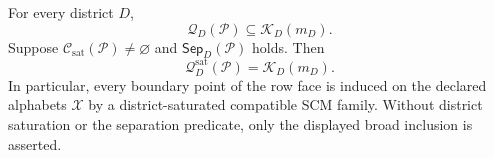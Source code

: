 For every district \(D\),
\[
\mathcal Q_D(\mathcal P)\subseteq\mathcal K_D(m_D).
\]
Suppose \(\mathcal C_{\mathrm{sat}}(\mathcal P)\ne\varnothing\) and \(\mathsf{Sep}_D(\mathcal P)\) holds.  Then
\[
\mathcal Q_D^{\mathrm{sat}}(\mathcal P)=\mathcal K_D(m_D).
\]
In particular, every boundary point of the row face is induced on the declared alphabets \(\mathcal X\) by a district-saturated compatible SCM family.  Without district saturation or the separation predicate, only the displayed broad inclusion is asserted.
